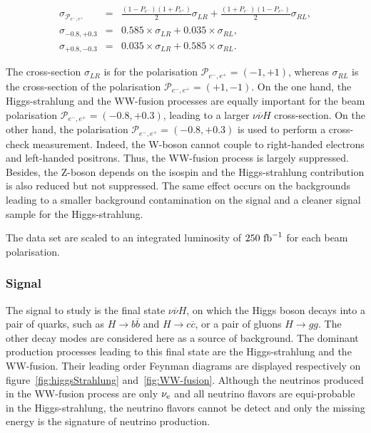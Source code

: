      \begin{equation}
       \begin{array}{lrc}
       \sigma_{\mathcal{P}_{e^-,e^+}} & = & \frac{(1 - P_{e^-})(1+P_{e^+})}{2} \sigma_{LR} + \frac{(1+P_{e^-})(1-P_{e^+})}{2} \sigma_{RL}, \\
       \sigma_{-0.8,+0.3} & = & 0.585 \times \sigma_{LR} + 0.035 \times \sigma_{RL}, \\
       \sigma_{+0.8,-0.3} & = & 0.035 \times \sigma_{LR} + 0.585 \times \sigma_{RL}.
       \end{array}
     \end{equation}

     The cross-section $\sigma_{LR}$ is for the polarisation $\mathcal{P}_{e^-,e^+} = (-1,+1)$, whereas $\sigma_{RL}$ is the cross-section of the polarisation $\mathcal{P}_{e^-,e^+} = (+1,-1)$.
     On the one hand, the Higgs-strahlung and the WW-fusion processes are equally important for the beam polarisation  $\mathcal{P}_{e^-,e^+} = (-0.8,+0.3)$, leading to a larger $\nu\overline{\nu} H$ cross-section.
     On the other hand, the polarisation $\mathcal{P}_{e^-,e^+} = (-0.8,+0.3)$ is used to perform a cross-check measurement.
     Indeed, the W-boson cannot couple to right-handed electrons and left-handed positrons.
     Thus, the WW-fusion process is largely suppressed.
     Besides, the Z-boson depends on the isospin and the Higgs-strahlung contribution is also reduced but not suppressed.
     The same effect occurs on the backgrounds leading to a smaller background contamination on the signal and a cleaner signal sample for the Higgs-strahlung.

     The data set are scaled to an integrated luminosity of $250~\rm{fb}^{-1}$ for each beam polarisation.

  \subsubsection{Signal}

    The signal to study is the final state $\nu\overline{\nu}H$, on which the Higgs boson decays into a pair of quarks, such as $H \rightarrow b\overline{b}$ and $H \rightarrow c\overline{c}$, or a pair of gluons $H \rightarrow gg$. 
    The other decay modes are considered here as a source of background. 
    The dominant production processes leading to this final state are the Higgs-strahlung and the WW-fusion.
    Their leading order Feynman diagrams are displayed respectively on figure~\ref{fig:higgsStrahlung} and~\ref{fig:WW-fusion}.
    Although the neutrinos produced in the WW-fusion process are only $\nu_{\rm{e}}$ and all neutrino flavors are equi-probable in the Higgs-strahlung, the neutrino flavors cannot be detect and only the missing energy is the signature of neutrino production.


